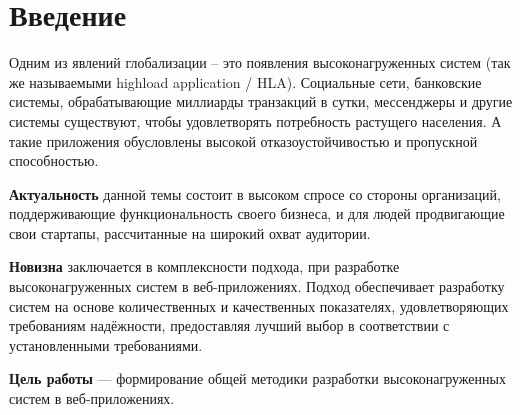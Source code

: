 \chapter*{Введение} 

Одним из явлений глобализации – это появления высоконагруженных систем (так же называемыми highload application / HLA). Социальные сети, банковские системы, обрабатывающие миллиарды транзакций в сутки, мессенджеры и другие системы существуют, чтобы удовлетворять потребность растущего населения. А такие приложения обусловлены высокой отказоустойчивостью и пропускной способностью.

\textbf{Актуальность} данной темы состоит в высоком спросе со стороны организаций, поддерживающие функциональность своего бизнеса, и для людей продвигающие свои стартапы, рассчитанные на широкий охват аудитории.


\textbf{Новизна} заключается в комплексности подхода, при разработке высоконагруженных систем в веб-приложениях. Подход обеспечивает разработку систем на основе количественных и качественных показателях, удовлетворяющих требованиям надёжности, предоставляя лучший выбор в соответствии с установленными требованиями.


\textbf{Цель работы} --- формирование общей методики разработки высоконагруженных систем в веб-приложениях.


